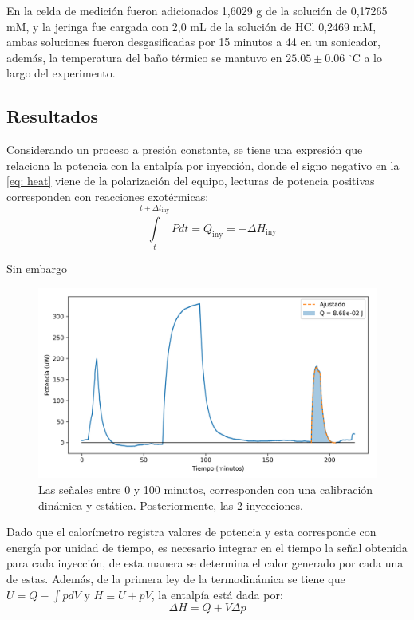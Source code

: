	En la celda de medición fueron adicionados 1,6029 g de la solución de  0,17265 mM, y la jeringa fue cargada con 2,0 mL de la soluci\'on de HCl 0,2469 mM, ambas soluciones fueron desgasificadas por 15 minutos a 44 \grad{} en un sonicador, adem\'as, la temperatura del ba\~no t\'ermico se mantuvo en $25.05 \pm 0.06$ $^\circ$C a lo largo del experimento.
	
\subsection{Resultados}
	Considerando un proceso a presi\'on constante, se tiene una expresi\'on que relaciona la potencia con la entalp\'ia por inyecci\'on, donde el signo negativo en la \autoref{eq: heat} viene de la polarizaci\'on del equipo, lecturas de potencia positivas corresponden con reacciones exot\'ermicas:
	\begin{equation}\label{eq: heat}
		\int\limits_t^{t + \Delta t_\text{iny}} Pdt = Q_\text{iny} = -\Delta H_\text{iny}
	\end{equation}
	
	Sin embargo
	
	\begin{figure}[h]
		\centering
		\includegraphics[width=\linewidth]{../Data/ChemicalCalibrations/HCl}
		\caption{Las se\~nales entre 0 y 100 minutos, corresponden con una calibraci\'on din\'amica y est\'atica. Posteriormente, las 2 inyecciones.}
		\label{fig: HClResults}
	\end{figure}

	Dado que el calor\'imetro registra valores de potencia y esta corresponde con energ\'ia por unidad de tiempo, es necesario integrar en el tiempo la se\~nal obtenida para cada inyecci\'on, de esta manera se determina el calor generado por cada una de estas. Adem\'as, de la primera ley de la termodin\'amica se tiene que $U = Q - \int pdV$ y $H\equiv U+pV$, la entalp\'ia est\'a dada por:
	\begin{equation}
		\Delta H = Q + V\Delta p
	\end{equation}
	
